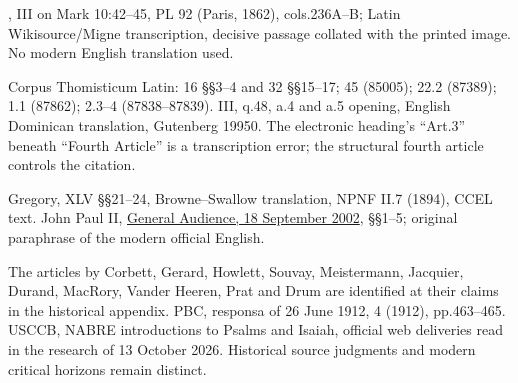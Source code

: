\begin{description}[style=nextline,leftmargin=0pt,labelsep=0pt,itemsep=.35em]
\item[Bede]
, III on Mark 10:42--45, PL 92 (Paris, 1862), cols.236A--B; Latin Wikisource/Migne transcription, decisive passage collated with the printed image. No modern English translation used.
\item[Thomas Aquinas]
Corpus Thomisticum Latin:  16 §§3--4 and 32 §§15--17;  45 (85005);  22.2 (87389);  1.1 (87862);  2.3--4 (87838--87839).  III, q.48, a.4 and a.5 opening, English Dominican translation, Gutenberg 19950. The electronic heading's ``Art.3'' beneath ``Fourth Article'' is a transcription error; the structural fourth article controls the citation.
\item[Gregory Nazianzen and John Paul II]
Gregory,  XLV §§21--24, Browne--Swallow translation, NPNF II.7 (1894), CCEL text. John Paul II, \href{https://www.vatican.va/content/john-paul-ii/en/audiences/2002/documents/hf_jp-ii_aud_20020918.html}{General Audience, 18 September 2002}, §§1--5; original paraphrase of the modern official English.
\item[Historical orientation]
The  articles by Corbett, Gerard, Howlett, Souvay, Meistermann, Jacquier, Durand, MacRory, Vander Heeren, Prat and Drum are identified at their claims in the historical appendix. PBC, responsa of 26 June 1912,  4 (1912), pp.463--465. USCCB, NABRE introductions to Psalms and Isaiah, official web deliveries read in the research of 13 October 2026. Historical source judgments and modern critical horizons remain distinct.
\end{description}
